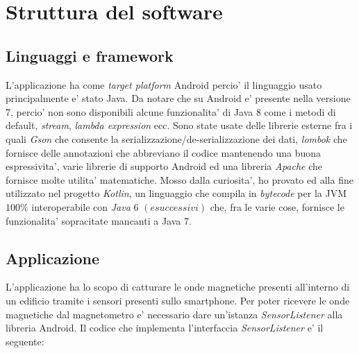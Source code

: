 \chapter{Struttura del software}

\section{Linguaggi e framework}
L'applicazione ha come \textit{target platform} Android percio' il linguaggio usato principalmente e' stato Java. Da notare che su Android e' presente nella versione 7, percio' non sono disponibili alcune funzionalita' di Java 8 come i metodi di default, \textit{stream}, \textit{lambda expression} ecc. Sono state usate delle librerie esterne fra i quali \textit{Gson} che consente la serializzazione/de-serializzazione dei dati, \textit{lombok} che fornisce delle annotazioni che abbreviano il codice mantenendo una buona espressivita', varie librerie di supporto Android ed una libreria \textit{Apache} che fornisce molte utilita' matematiche. Mosso dalla curiosita', ho provato ed alla fine utilizzato nel progetto \textit{Kotlin}, un linguaggio che compila in \textit{bytecode} per la JVM $100 \%$ interoperabile con \textit{Java} 6 $(e successivi)$ che, fra le varie cose, fornisce le funzionalita' sopracitate mancanti a Java 7.

\section{Applicazione}
L'applicazione ha lo scopo di catturare le onde magnetiche presenti all'interno di un edificio tramite i sensori presenti sullo smartphone. Per poter ricevere le onde magnetiche dal magnetometro e' necessario dare un'istanza \textit{SensorListener} alla libreria Android. Il codice che implementa l'interfaccia \textit{SensorListener} e' il seguente:


